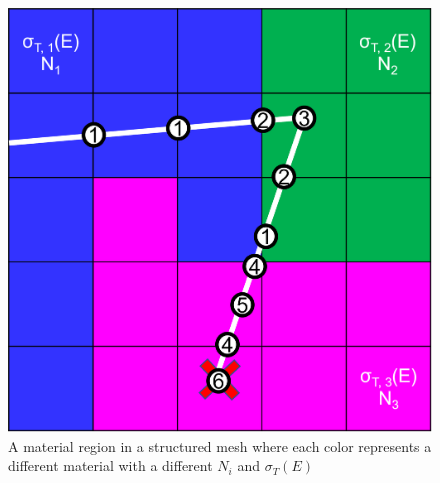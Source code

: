 \begin{figure}[!htb]
  \centering
  \includegraphics[scale=0.95]{appendix/mcatk_figures/algo.png}
  \caption{A material region in a structured mesh where each color represents a different material with a different ${N_i}$ and ${\sigma_T(E)}$}
  \label{fig:algo}
\end{figure}

